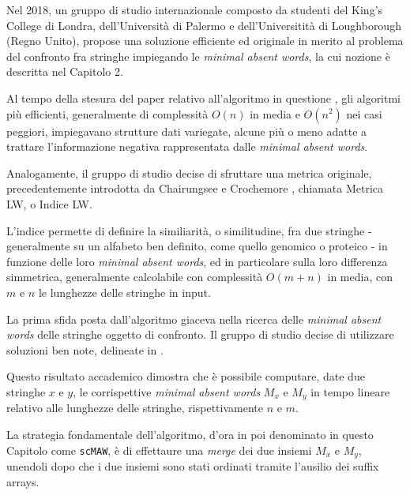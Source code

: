 Nel 2018, un gruppo di studio internazionale composto da studenti del King's College di Londra, dell'Università di Palermo e dell'Universitità di Loughborough (Regno Unito), propose una soluzione efficiente ed originale in merito al problema del confronto fra stringhe impiegando le \textit{minimal absent words}, la cui nozione è descritta nel Capitolo 2. 

\vspace{3mm}

Al tempo della stesura del paper relativo all'algoritmo in questione \cite{scMAW}, gli algoritmi più efficienti, generalmente di complessità $O(n)$ in media e $O(n^2 )$ nei casi peggiori, impiegavano strutture dati variegate, alcune più o meno adatte a trattare l'informazione negativa rappresentata dalle \textit{minimal absent words}. 

\vspace{3mm}

Analogamente, il gruppo di studio decise di sfruttare una metrica originale, precedentemente introdotta da Chairungsee e Crochemore \cite{maw1}, chiamata Metrica LW, o Indice LW. 

\vspace{3mm}

L'indice permette di definire la similiarità, o similitudine, fra due stringhe - generalmente su un alfabeto ben definito, come quello genomico o proteico - in funzione delle loro \textit{minimal absent words}, ed in particolare sulla loro differenza simmetrica, generalmente calcolabile con complessità $O(m+n)$ in media, con $m$ e $n$ le lunghezze delle stringhe in input.

\vspace{3mm}

La prima sfida posta dall'algoritmo giaceva nella ricerca delle \textit{minimal absent words} delle stringhe oggetto di confronto. Il gruppo di studio decise di utilizzare soluzioni ben note, delineate in \cite{maw1}. 

Questo risultato accademico dimostra che è possibile computare, date due stringhe $x$ e $y$, le corrispettive \textit{minimal absent words} $M_x$ e $M_y$ in tempo lineare relativo alle lunghezze delle stringhe, rispettivamente $n$ e $m$. 

\vspace{3mm}

La strategia fondamentale dell'algoritmo, d'ora in poi denominato in questo Capitolo come \verb|scMAW|, è di effettaure una \textit{merge} dei due insiemi $M_x$ e $M_y$, unendoli dopo che i due insiemi sono stati ordinati tramite l'ausilio dei suffix arrays. 

